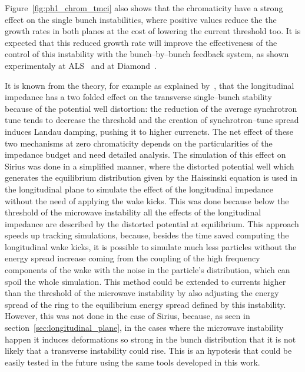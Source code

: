     Figure~\ref{fig:ph1_chrom_tmci} also shows that the chromaticity have a strong effect on the single bunch instabilities, where positive values reduce the the growth rates in both planes at the cost of lowering the current threshold too. It is expected that this reduced growth rate will improve the effectiveness of the control of this instability with the bunch--by--bunch feedback system, as shown experimentaly at ALS~\cite{Byrd1997} and at Diamond~\cite{Koukovini-Platia2017}.

    It is known from the theory, for example as explained by~, that the longitudinal impedance has a two folded effect on the transverse single--bunch stability because of the potential well distortion: the reduction of the average synchrotron tune tends to decrease the threshold and the creation of synchrotron--tune spread induces Landau damping, pushing it to higher currencts. The net effect of these two mechanisms at zero chromaticity depends on the particularities of the impedance budget and need detailed analysis. The simulation of this effect on Sirius was done in a simplified manner, where the distorted potential well which generates the equilibrium distribution given by the Haissinski equation is used in the longitudinal plane to simulate the effect of the longitudinal impedance without the need of applying the wake kicks. This was done because below the threshold of the microwave instability all the effects of the longitudinal impedance are described by the distorted potential at equilibrium. This approach speeds up tracking simulations, because, besides the time saved computing the longitudinal wake kicks, it is possible to simulate much less particles without the energy spread increase coming from the coupling of the high frequency components of the wake with the noise in the particle's distribution, which can spoil the whole simulation. This method could be extended to currents higher than the threshold of the microwave instability by also adjusting the energy spread of the ring to the equilibrium energy spread defined by this instability. However, this was not done in the case of Sirius, because, as seen in section~\ref{sec:longitudinal_plane}, in the cases where the microwave instability happen it induces deformations so strong in the bunch distribution that it is not likely that a transverse instability could rise. This is an hypotesis that could be easily tested in the future using the same tools developed in this work.

